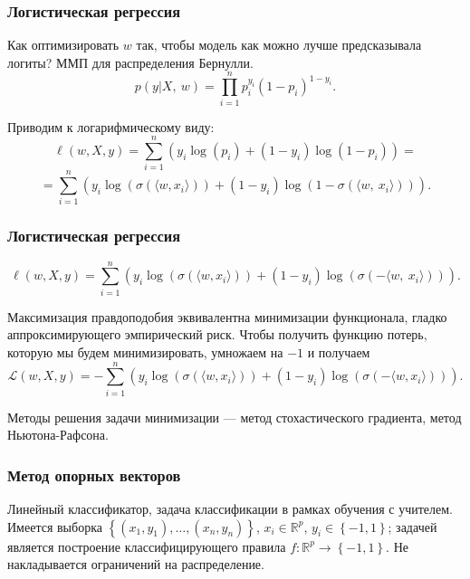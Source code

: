 \documentclass[11pt]{beamer}
\begin{document}
\begin{frame}
	\frametitle{Логистическая регрессия}
		
	Как оптимизировать $w$ так, чтобы модель как можно лучше предсказывала логиты? ММП для распределения Бернулли.
	$$
	p(y|X,\ w)=\prod_{i=1}^{n} p_{i}^{y_{\mathfrak{i}}}(1-p_{i})^{1-y_{i}}.
	$$
	
	Приводим к логарифмическому виду:
	$$
	\ell(w,X,y)=\sum_{i=1}^{n} (y_{i}\log(p_{i})+(1-y_{i})\log(1-p_{i}))=
	$$
	$$
	=\sum_{i=1}^{n} (y_{i}\log(\sigma(\langle w,x_{i} \rangle))+(1-y_{i})\log(1-\sigma(\langle w,\ x_{i}\rangle))).
	$$
	
\end{frame}

\begin{frame}
	\frametitle{Логистическая регрессия}
	$$
	\ell(w,X,y)=\sum_{i=1}^{n}(y_{i} \log(\sigma(\langle w,x_{i} \rangle))+(1-y_{i})\log(\sigma(-\langle w,\ x_{i}\rangle))).
	$$
	
	Максимизация правдоподобия эквивалентна минимизации функционала, гладко аппроксимирующего эмпирический риск. Чтобы получить функцию потерь, которую мы будем минимизировать, умножаем на $-1$ и получаем
	$$
	\mathcal{L}(w,X,y)=-\sum_{i=1}^{n} (y_{i}\log(\sigma(\langle w,x_{i} \rangle))+(1-y_{i})\log(\sigma(-\langle w,x_{i} \rangle))).
	$$
	
	Методы решения задачи минимизации --- метод стохастического градиента, метод Ньютона-Рафсона.
	
\end{frame}



\begin{frame}
	\frametitle{Метод опорных векторов}
	
	Линейный классификатор, задача классификации в рамках обучения с учителем.
	Имеется выборка $\left\{\left(x_1, y_1\right), \dots, \left(x_n, y_n\right)\right\}$, $x_i\in\mathbb{R}^p$, $y_i\in\left\{-1, 1\right\}$;
	задачей является построение классифицирующего правила $f:\mathbb{R}^p\rightarrow \left\{-1, 1\right\}$. Не накладывается ограничений на распределение.
	
	
\end{frame}
\end{document}
